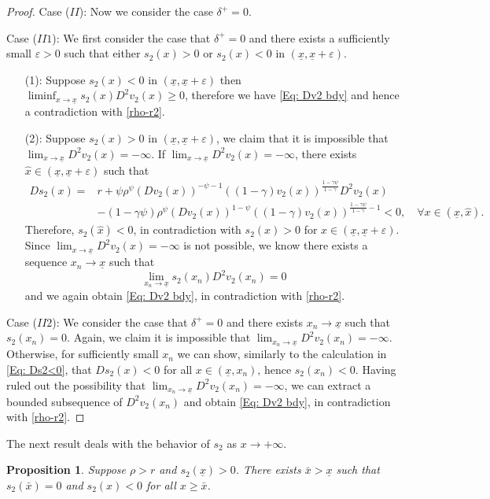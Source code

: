 \documentclass[11pt]{article}
\numberwithin{equation}{section}
\newtheorem{prop}[thm]{Proposition}
\theoremstyle{definition}
\newcommand{\eps}{\varepsilon}
\newcommand{\ux}{{\underline x}}
\newcommand{\beq}{\begin{equation}}
\newcommand{\eeq}{\end{equation}}
\newcommand{\g}{\gamma}
\newcommand{\p}{\psi}
\newcommand{\hx}{\hat{x}}
\theoremstyle{plain}
\begin{document}
\begin{proof}
Case ($II$): Now we consider the case $\delta^+=0$.\par
Case ($II1$): We first consider the case that $\delta^+=0$ and there exists a sufficiently small $\eps>0$ such that either $s_2(x)>0$ or $s_2(x)<0$ in $(\ux,\ux+\eps)$.
  \begin{itemize}
 \item[(1):]
 Suppose $s_2(x)<0$ in $(\ux,\ux+\eps)$ then $\liminf_{x\to \ux}s_2(x)D^2v_2(x)\geq 0$, therefore we have
\eqref{Eq: Dv2 bdy} and hence a contradiction with \eqref{rho-r2}.
 \item[(2):]
 Suppose $s_2(x)>0$ in $(\ux,\ux+\eps)$, we claim that it is impossible that $\lim_{x\to \ux}D^2v_2(x)= -\infty$. If $\lim_{x\to \ux}D^2v_2(x)= -\infty$, there exists $\hat{x}\in (\ux,\ux+\eps)$ such that
\beq\label{Eq: Ds2<0}
 \begin{aligned}
 Ds_2(x)={}&r+\p \rho^{\p}(Dv_2(x))^{-\p-1}((1-\g)v_2(x))^{\frac{1-\g \p}{1-\g}}D^2v_2(x)\\
 &-(1-\g \p)\rho^{\p}(Dv_2(x))^{1-\p}((1-\g)v_2(x))^{\frac{1-\g \p}{1-\g}-1} <0,\quad \forall x\in (\ux,\hx).
 \end{aligned}
\eeq
Therefore, $s_2(\hx)<0$, in contradiction with $s_2(x)>0$ for $x\in (\ux,\ux+\eps)$. 
Since $\lim_{x\to \ux}D^2v_2(x)= -\infty$ is not possible, we know there exists a sequence $x_n\to \ux$ such that $$\lim_{x_n\to \ux}s_2(x_n)D^2v_2(x_n)= 0$$ and we again obtain \eqref{Eq: Dv2 bdy}, in contradiction with \eqref{rho-r2}.
 \end{itemize}
Case ($II2$): We consider the case that $\delta^+=0$ and there exists $x_n\to \ux$ such that $s_2(x_n)=0$. Again, we claim it is impossible that $\lim_{x_n\to \ux}D^2v_2(x_n)= -\infty$. Otherwise, for sufficiently small $x_n$ we can show, similarly to the calculation in \eqref{Eq: Ds2<0}, that $Ds_2(x)<0$ for all $x\in (\ux,x_n)$, hence $s_2(x_n)<0$. Having ruled out the possibility that $\lim_{x_n\to \ux}D^2v_2(x_n)= -\infty$, we can extract a bounded subsequence of $D^2v_2(x_n)$ and obtain \eqref{Eq: Dv2 bdy}, in contradiction with \eqref{rho-r2}.
\end{proof}
The next result deals with the behavior of $s_2$ as $x\to +\infty$. 
\begin{prop}\label{Prop:s2 barx}
Suppose $\rho>r$ and $s_2(\ux)>0$. There exists $\bar{x}>\ux$ such that $s_2(\bar{x})=0$ and $s_2(x)<0$ for all $x\geq \bar{x}$.
\end{prop}
\end{document}
